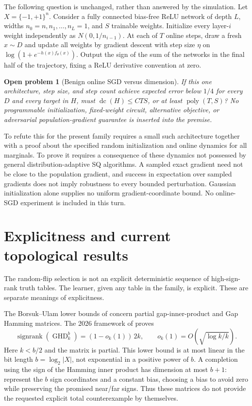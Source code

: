 \documentclass[11pt]{article}
\newtheorem*{openproblem}{Open problem}
\DeclareMathOperator{\dc}{dc}
\DeclareMathOperator{\sr}{signrank}
\newcommand{\1}{\mathbf 1}
\begin{document}
The following question is unchanged, rather than answered by the simulation. Let $X=\{-1,+1\}^n$. Consider a fully connected bias-free ReLU network of depth $L$, widths $n_0=n,n_1,\ldots,n_L=1$, and $S$ trainable weights. Initialize every layer-$i$ weight independently as $N(0,1/n_{i-1})$. At each of $T$ online steps, draw a fresh $x\sim D$ and update all weights by gradient descent with step size $\eta$ on $\log(1+e^{-h(x)f_\theta(x)})$. Output the sign of the sum of the networks in the final half of the trajectory, fixing a ReLU derivative convention at zero.
\begin{openproblem}[Benign online SGD versus dimension]
If this one architecture, step size, and step count achieve expected error below $1/4$ for every $D$ and every target in $H$, must $\dc(H)\le CTS$, or at least $\operatorname{poly}(T,S)$? No programmable initialization, fixed-weight circuit, alternative objective, or adversarial population-gradient guarantee is inserted into the premise.
\end{openproblem}
To refute this for the present family requires a small such architecture together with a proof about the specified random initialization and online dynamics for all marginals. To prove it requires a consequence of these dynamics not possessed by general distribution-adaptive SQ algorithms. A sampled exact gradient need not be close to the population gradient, and success in expectation over sampled gradients does not imply robustness to every bounded perturbation. Gaussian initialization alone supplies no uniform gradient-coordinate bound. No online-SGD experiment is included in this turn.

\section{Explicitness and current topological results}
The random-flip selection is not an explicit deterministic sequence of high-sign-rank truth tables. The learner, given any table in the family, is explicit. These are separate meanings of explicitness.

The Borsuk--Ulam lower bounds of \citet{HHM23} concern partial gap-inner-product and Gap Hamming matrices. The 2026 framework of \citet{FHV26} proves
\[
 \sr(\operatorname{GHD}_k^b)=(1-o_k(1))\,2k,
 \qquad o_k(1)=O\left(\sqrt{\log k/k}\right).
\]
Here $k<b/2$ and the matrix is partial. This lower bound is at most linear in the bit length $b=\log_2|X|$, not exponential in a positive power of $b$. A completion using the sign of the Hamming inner product has dimension at most $b+1$: represent the $b$ sign coordinates and a constant bias, choosing a bias to avoid zero while preserving the promised near/far signs. Thus these matrices do not provide the requested explicit total counterexample by themselves.
\end{document}
